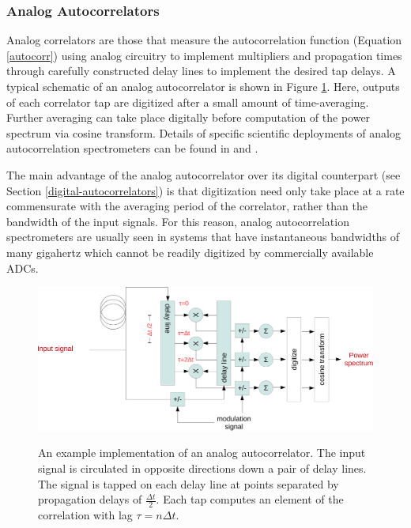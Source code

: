 \documentclass{article}
\begin{document}
\subsubsection{Analog Autocorrelators}\label{analog-autocorrelators}

Analog correlators are those that measure the autocorrelation function (Equation \ref{autocorr}) using analog circuitry to implement multipliers and propagation times through carefully constructed delay lines to implement the desired tap delays.
A typical schematic of an analog autocorrelator is shown in Figure \ref{fig:analog-autocorr}. Here, outputs of each correlator tap are digitized after a small amount of time-averaging. Further averaging can take place digitally before computation of the power spectrum via cosine transform. Details of specific scientific deployments of analog autocorrelation spectrometers can be found in \cite{Erickson2007} and \cite{Harris1998}.

The main advantage of the analog autocorrelator over its digital counterpart (see Section \ref{digital-autocorrelators}) is that digitization need only take place at a rate commensurate with the averaging period of the correlator, rather than the bandwidth of the input signals. For this reason, analog autocorrelation spectrometers are usually seen in systems that have instantaneous bandwidths of many gigahertz which cannot be readily digitized by commercially available ADCs.


\begin{figure}
 \centering
 \includegraphics[width=\textwidth]{./figures/analog-autocorr-crop.pdf}
 \label{fig:analog-autocorr}
 \caption{An example implementation of an analog autocorrelator. The input signal is circulated in opposite directions down a pair of delay lines. The signal is tapped on each delay line at points separated by propagation delays of $\frac{\Delta t}{2}$. Each tap computes an element of the correlation with lag $\tau=n\Delta t$.}
\end{figure}
\end{document}

